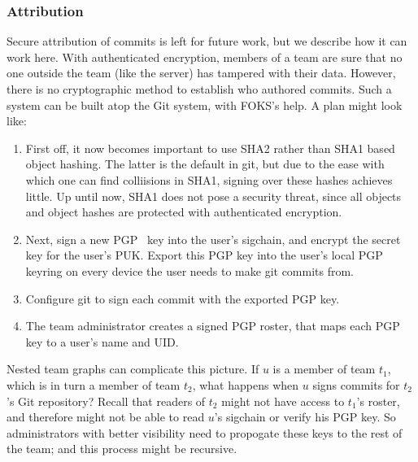 \subsubsection{Attribution}

Secure attribution of commits is left for future work, but we describe how it
can work here. With authenticated encryption, members of a team are sure that no
one outside the team (like the server) has tampered with their data. However,
there is no cryptographic method to establish who authored commits. Such a
system can be built atop the Git system, with FOKS's help. A plan might look like:

\begin{enumerate}

    \item
First off, it now
becomes important to use SHA2 rather than SHA1 based object hashing. The latter
is the default in git, but due to the ease with which one can find colliisions
in SHA1, signing over these hashes achieves little. Up until now, SHA1 does
not pose a security threat, since all objects and object hashes are protected
with authenticated encryption.

    \item Next, sign a new PGP~\cite{pgp} key into the user's sigchain,
      and encrypt the secret key for the user's PUK. Export this PGP
      key into the user's local PGP keyring on every device the user
      needs to make git commits from.

    \item Configure git to sign each commit with the exported PGP key.

    \item The team administrator creates a signed PGP roster, that maps
      each PGP key to a user's name and UID.

\end{enumerate}

Nested team graphs can complicate this picture. If $u$ is a member of team $t_1$,
which is in turn a member of team $t_2$, what happens when $u$ signs commits
for $t_2$'s Git repository? Recall that readers of $t_2$ might not have access 
to $t_1$'s roster, and therefore might not be able to read $u$'s sigchain
or verify his PGP key. So administrators with better visibility need
to propogate these keys to the rest of the team; and this process 
might be recursive.